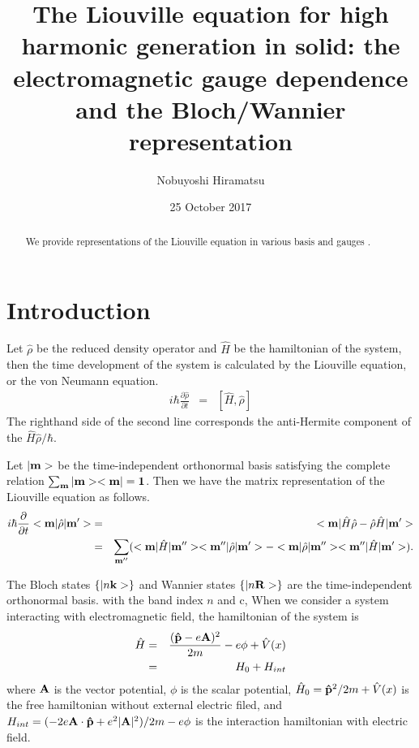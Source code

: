 \documentclass[aps,prb,preprint]{revtex4-1}
\begin{document}
\title{The Liouville equation for high harmonic generation in solid: the electromagnetic gauge dependence and the Bloch/Wannier representation}
\author{Nobuyoshi Hiramatsu}
\date{25 October 2017}
\begin{abstract}
We provide representations of the Liouville equation in various basis and gauges .
\end{abstract}
\maketitle

\section{Introduction}
Let $\hat{\rho}$ be the reduced density operator and $\hat{H}$ be the hamiltonian of the system, then the time development of the system is calculated by the Liouville equation, or the von Neumann equation.
\begin{eqnarray}
i \hbar \frac{\partial \hat{\rho} }{\partial t } &=&  [\hat{H}, \hat{\rho}] %
\end{eqnarray}
The righthand side of the second line corresponds the anti-Hermite component of the $\hat{H}\hat{\rho}/ \hbar$.

Let $|{\bf m}>$ be the time-independent orthonormal basis satisfying the complete relation $\sum_{\bf m} |{\bf m}><{\bf m}| = {\bf 1}$. Then we have the matrix representation of the Liouville equation as follows.
\begin{eqnarray}
i \hbar \frac{ \partial }{\partial t } <{\bf m}| \hat{\rho} |{\bf m'}> &=&  <{\bf m}| \hat{H} \hat{\rho} - \hat{\rho} \hat{H} |{\bf m'}> \nonumber\\
&=&  \sum_{{\bf m''}} ( <{\bf m}| \hat{H} |{\bf m''}><{\bf m''}| \hat{\rho} |{\bf m'}> - <{\bf m}| \hat{\rho} |{\bf m''}><{\bf m''}| \hat{H} |{\bf m'}> ).\label{eq:LE2} 
\end{eqnarray} 



The Bloch states $\{ |n{\bf k}> \}$ and Wannier states $\{ |n{\bf R}> \}$ are the time-independent orthonormal basis.
with the band index $n$ and c,
When we consider a system interacting with electromagnetic field, the hamiltonian of the system is
 \begin{eqnarray}
 \hat{H} &=&\frac{ ({\bf \hat{p}} - e{\bf A})^2 }{2m} -e \phi + \hat{V}(x) \nonumber \\ 
 &=& H_0 + H_{int} 
 \end{eqnarray}
where ${\bf A}$ is the vector potential, $\phi$ is the scalar potential, $\hat{H}_0 = {\bf \hat{p}}^2/2m + \hat{V}(x)$ is the free hamiltonian without external electric filed, and $H_{int} =( - 2e{\bf A} \cdot {\bf \hat{p}} + e^2 |{\bf A}|^2)/2m -e \phi$ is the interaction hamiltonian with electric field.
\end{document}
